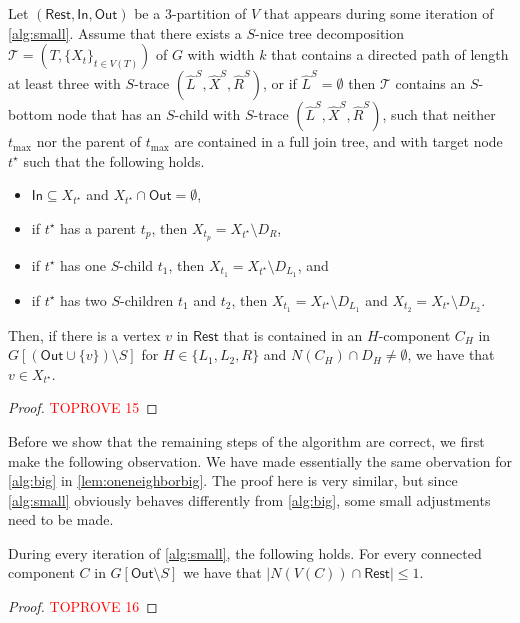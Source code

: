 \documentclass[a4paper,UKenglish,cleveref, autoref, thm-restate, numberwithinsect]{lipics-v2021}
\newcounter{algorithm}
\newcommand{\slim}{\text{slim}\xspace}
\newcommand{\In}{\mathsf{In}}
\newcommand{\Out}{\mathsf{Out}}
\newcommand{\Rest}{\mathsf{Rest}}
\begin{document}
\begin{lemma}\label{lem:regularstep2}
Let $(\Rest,\In,\Out)$ be a 3-partition of $V$ that appears during some iteration of \cref{alg:small}. 
Assume that there exists a \slim $S$-nice tree decomposition $\mathcal{T}=(T,\{X_t\}_{t\in V(T)})$ of $G$ with width $k$ that contains a directed path of length at least three with $S$-trace $(\hat{L}^S, \hat{X}^S, \hat{R}^S)$, or if $\hat{L}^S=\emptyset$ then $\mathcal{T}$ contains an $S$-bottom node that has an $S$-child with $S$-trace $(\hat{L}^S, \hat{X}^S, \hat{R}^S)$, such that neither $t_{\max}$ nor the parent of $t_{\max}$ are contained in a full join tree, and with target node ${t^\star}$ such that the following holds.
\begin{itemize}
    \item $\In\subseteq X_{t^\star}$ and $X_{t^\star}\cap \Out=\emptyset$, 
    \item if $t^\star$ has a parent $t_p$, then $X_{t_p}=X_{t^\star}\setminus D_R$, 
    \item if $t^\star$ has one $S$-child $t_1$, then $X_{t_1}=X_{t^\star}\setminus D_{L_1}$, and 
    \item if $t^\star$ has two $S$-children $t_1$ and $t_2$, then $X_{t_1}=X_{t^\star}\setminus D_{L_1}$ and $X_{t_2}=X_{t^\star}\setminus D_{L_2}$.
\end{itemize} 
Then, if there is a vertex $v$ in $\Rest$ that is contained in an $H$-component $C_H$ in $G[(\Out\cup\{v\})\setminus S]$ for $H\in\{L_1,L_2,R\}$ and $N(C_H)\cap D_H\neq \emptyset$, we have that $v\in X_{t^\star}$.

\end{lemma}
\begin{proof}\textcolor{red}{TOPROVE 15}\end{proof}

Before we show that the remaining steps of the algorithm are correct, we first make the following observation. We have made essentially the same obervation for \cref{alg:big} in \cref{lem:oneneighborbig}. The proof here is very similar, but since \cref{alg:small} obviously behaves differently from \cref{alg:big}, some small adjustments need to be made.
\begin{lemma}\label{lem:oneneighbor}
During every iteration of \cref{alg:small}, the following holds. For every connected component $C$ in $G[\Out\setminus S]$ we have that $|N(V(C))\cap \Rest|\le 1$.
\end{lemma}
\begin{proof}\textcolor{red}{TOPROVE 16}\end{proof}
\end{document}
